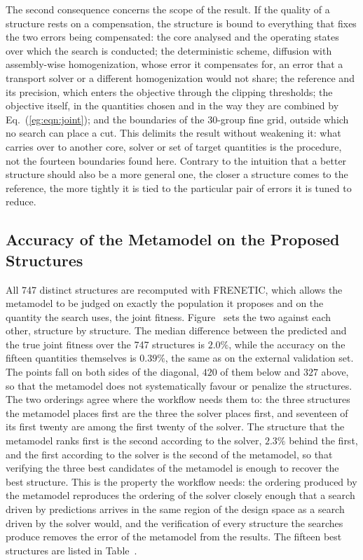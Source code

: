 The second consequence concerns the scope of the result. If the quality of a
structure rests on a compensation, the structure is bound to everything that
fixes the two errors being compensated: the core analysed and the operating
states over which the search is conducted; the deterministic scheme, diffusion
with assembly-wise homogenization, whose error it compensates for, an error
that a transport solver or a different homogenization would not share; the reference
and its precision, which enters the objective through the clipping thresholds;
the objective itself, in the quantities chosen and in the way they are combined
by Eq.~(\ref{eg:eqn:joint}); and the boundaries of the 30-group fine grid,
outside which no search can place a cut. This delimits the result without
weakening it: what carries over to another core, solver or set of target
quantities is the procedure, not the fourteen boundaries found here. Contrary to
the intuition that a better structure should also be a more general one, the
closer a structure comes to the reference, the more tightly it is tied to the
particular pair of errors it is tuned to reduce.

\subsection{Accuracy of the Metamodel on the Proposed Structures}\label{eg:sec:accuracy}

All 747 distinct structures are recomputed with FRENETIC, which allows the
metamodel to be judged on exactly the population it proposes and on the quantity the search uses, the joint fitness.
Figure~ sets the two against each other, structure by
structure. The median difference between the predicted and the true joint
fitness over the 747 structures is
$2.0\%$, while the accuracy on the fifteen quantities themselves is $0.39\%$,
the same as on the external
validation set. The points fall on both sides of the diagonal, $420$ of them
below and $327$ above, so that the metamodel does not systematically favour or
penalize the structures. The two orderings agree where the workflow needs them to: the
three structures the metamodel places first are the three the solver places
first, and seventeen of its first twenty are among the first twenty of the
solver. The structure that the metamodel ranks first is the second
according to the solver, $2.3\%$ behind the first, and the first according to
the solver is the second of the metamodel, so that verifying the three best
candidates of the metamodel is enough to recover the best structure. This is
the property the workflow needs: the ordering produced by the metamodel
reproduces the ordering of the solver closely enough that a search driven by
predictions arrives in the same region of the design space as a search driven
by the solver would, and the verification of every structure the searches
produce removes the error of the metamodel from the results. The fifteen best structures are listed in
Table~.

